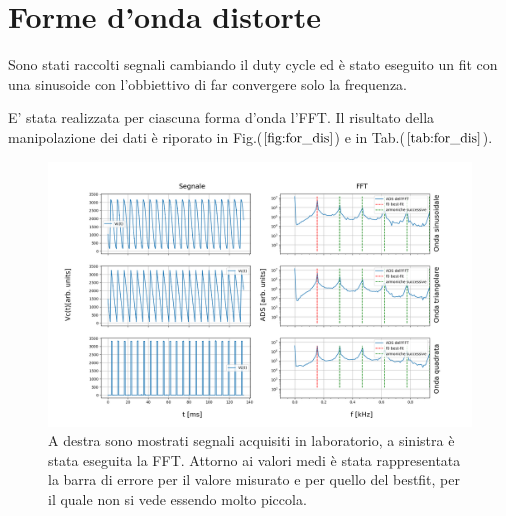 \documentclass{article}
\begin{document}
\section{Forme d'onda distorte}

        Sono stati raccolti segnali cambiando il duty cycle ed è stato eseguito un fit 
        con una sinusoide con l'obbiettivo di far convergere solo la frequenza.

        E' stata realizzata per ciascuna forma d'onda l'FFT.
        Il risultato della manipolazione dei dati è riporato in Fig.($\ref{fig:for_dis}$)
        e in Tab.($\ref{tab:for_dis}$).
        \begin{figure}[H]
                \centering
                \includegraphics[width=\textwidth]{FFT5/FFTwaveforms2.png}
                \caption{A destra sono mostrati segnali acquisiti in laboratorio, 
                        a sinistra è stata eseguita la FFT.
                        Attorno ai valori medi è stata rappresentata la barra di 
                        errore per il valore misurato e per quello del bestfit, 
                        per il quale non si vede essendo molto piccola.}
                \label{fig:for_dis}
        \end{figure}   
\end{document}
